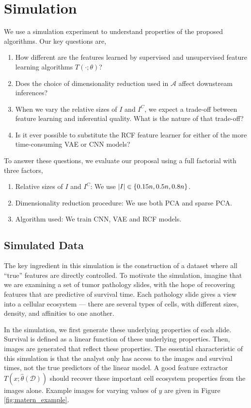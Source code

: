 
\section{Simulation}

We use a simulation experiment to understand properties of the proposed
algorithms. Our key questions are,

\begin{enumerate}
\item How different are the features learned by supervised and unsupervised
  feature learning algorithms $T\left(\cdot; \theta\right)$?
\item Does the choice of dimensionality reduction used in $\mathcal{A}$ affect
  downstream inferences?
\item When we vary the relative sizes of $I$ and $I^{C}$, we expect a trade-off
  between feature learning and inferential quality. What is the nature of that
  trade-off?
\item Is it ever possible to substitute the RCF feature learner for either of
  the more time-consuming VAE or CNN models?
\end{enumerate}

To answer these questions, we evaluate our proposal using a full factorial with
three factors,

\begin{enumerate}
\item Relative sizes of $I$ and $I^{C}$: We use $\left|I\right| \in \left\{0.15n, 0.5n, 0.8n\right\}$.
\item Dimensionality reduction procedure: We use both PCA and sparse PCA.
\item Algorithm used: We train CNN, VAE and RCF models.
\end{enumerate}

\subsection{Simulated Data}

The key ingredient in this simulation is the construction of a dataset where all
``true'' features are directly controlled. To motivate the simulation, imagine
that we are examining a set of tumor pathology slides, with the hope of
recovering features that are predictive of survival time. Each pathology slide
gives a view into a cellular ecosystem — there are several types of cells, with
different sizes, density, and affinities to one another.

In the simulation, we first generate these underlying properties of each slide.
Survival is defined as a linear function of these underlying properties. Then,
images are generated that reflect these properties. The essential characteristic
of this simulation is that the analyst only has access to the images and
survival times, not the true predictors of the linear model. A good feature
extractor $T\left(x; \hat{\theta}\left(\mathcal{D}\right)\right)$ should recover
these important cell ecosystem properties from the images alone. Example images
for varying values of $y$ are given in Figure \ref{fig:matern_example}.

